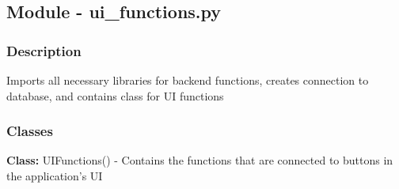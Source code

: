 \documentclass[12pt, titlepage]{article}
\begin{document}
    \subsection{Module - ui\_functions.py}

    \subsubsection{Description}
    Imports all necessary libraries for backend functions, creates connection to database, and contains class for UI functions
    
    \subsubsection{Classes}
    \textbf{Class:} UIFunctions() - Contains the functions that are connected to buttons in the application’s UI \\
    
\end{document}

